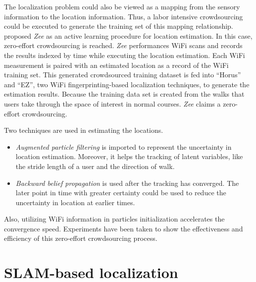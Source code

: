 \documentclass[letterpaper]{article}
\begin{document}
The localization problem could also be viewed as a mapping from the sensory information to the location information.
Thus, a labor intensive crowdsourcing could be executed to generate the training set of this mapping relationship.
\cite{Rai:2012:ZZC:2348543.2348580} proposed \emph{Zee} as an active learning procedure for location estimation.
In this case, zero-effort crowdsourcing is reached.
\emph{Zee} performances WiFi scans and records the results indexed by time while executing the location estimation.
Each WiFi measurement is paired with an estimated location as a record of the WiFi training set.
This generated crowdsourced training dataset is fed into ``Horus'' and ``EZ'', two WiFi fingerprinting-based localization techniques, to generate the estimation results.
Because the training data set is created from the walks that users take through the space of interest in normal courses.
\emph{Zee} claims a zero-effort crowdsourcing.

Two techniques are used in estimating the locations.
\begin{itemize}
\item \emph{Augmented particle filtering} is imported to represent the uncertainty in location estimation.
Moreover, it helps the tracking of latent variables, like the stride length of a user and the direction of walk.
\item \emph{Backward belief propagation} is used after the tracking has converged.
The later point in time with greater certainty could be used to reduce the uncertainty in location at earlier times.
\end{itemize}
Also, utilizing WiFi information in particles initialization accelerates the convergence speed.
Experiments have been taken to show the effectiveness and efficiency of this zero-effort crowdsourcing process.

\section{SLAM-based localization}
\end{document}
